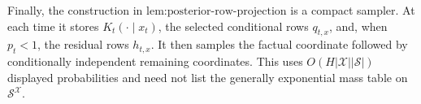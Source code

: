 Finally, the construction in \(\text{lem:posterior-row-projection}\) is a compact sampler.  At each time it stores \(K_t(\cdot\mid x_t)\), the selected conditional rows \(q_{t,x}\), and, when \(p_t<1\), the residual rows \(h_{t,x}\).  It then samples the factual coordinate followed by conditionally independent remaining coordinates.  This uses \(O(H|\mathcal X||\mathcal S|)\) displayed probabilities and need not list the generally exponential mass table on \(\mathcal S^{\mathcal X}\).